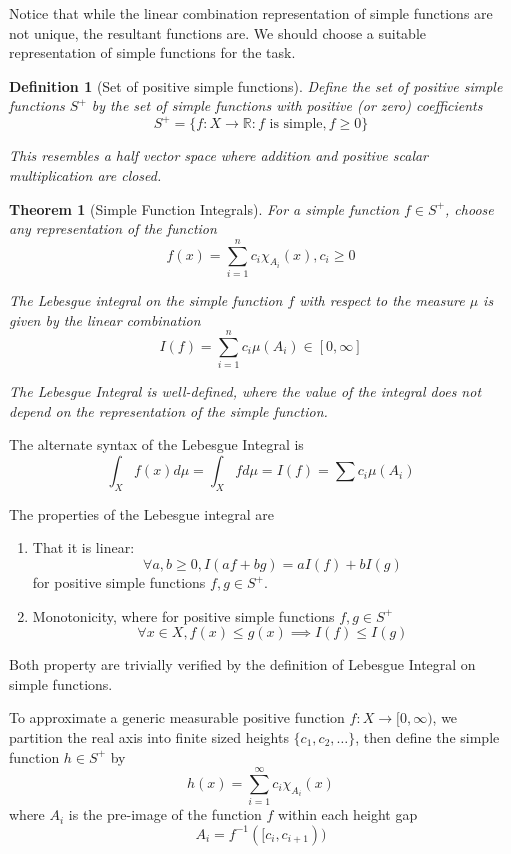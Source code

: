 \documentclass{article}
\newtheorem{theorem}{Theorem}[section]
\newtheorem{defi}{Definition}[section]
\begin{document}
Notice that while the linear combination representation of simple functions are not unique, the resultant functions are. We should choose a suitable representation of simple functions for the task.

\begin{defi}[Set of positive simple functions]
    Define the set of positive simple functions $S^+$ by the set of simple functions with positive (or zero) coefficients
    \[
    S^+ = \{f \colon X \to \mathbb{R} \colon \text{$f$ is simple}, f \geq 0\}
    \]

    This resembles a half vector space where addition and positive scalar multiplication are closed.

\end{defi}

\begin{theorem}[Simple Function Integrals]
    For a simple function $f \in S^+$, choose any representation of the function
    \[
        f(x) = \sum_{i=1}^n c_i \chi_{A_i}(x), c_i \geq 0
    \]

    The Lebesgue integral on the simple function $f$ with respect to the measure $\mu$ is given by the linear combination
    \[
        I(f) = \sum_{i=1}^n c_i \mu(A_i) \in [0, \infty]
    \]

    The Lebesgue Integral is well-defined, where the value of the integral does not depend on the representation of the simple function.
\end{theorem}

The alternate syntax of the Lebesgue Integral is
\[
    \int_X f(x) d\mu = \int_X f d\mu = I(f) = \sum c_i \mu(A_i)
\]

The properties of the Lebesgue integral are
\begin{enumerate}
    \item That it is linear:
    \[
    \forall a,b \geq 0, I(af + bg) = aI(f) + bI(g)
    \] for positive simple functions $f, g \in S^+$.
    \item Monotonicity, where for positive simple functions $f, g \in S^+$
    \[
        \forall x \in X, f(x) \leq g(x) \implies I(f) \leq I(g)
    \]
\end{enumerate}
Both property are trivially verified by the definition of Lebesgue Integral on simple functions.

To approximate a generic measurable positive function $f \colon X \to [0, \infty)$, we partition the real axis into finite sized heights $\{c_1, c_2, \dots\}$, then define the simple function $h \in S^+$ by
\[
    h(x) = \sum_{i=1}^{\infty} c_i \chi_{A_i}(x)
\]
where $A_i$ is the pre-image of the function $f$ within each height gap
\[
    A_i = f^{-1}([c_i, c_{i+1}))
\]
\end{document}
